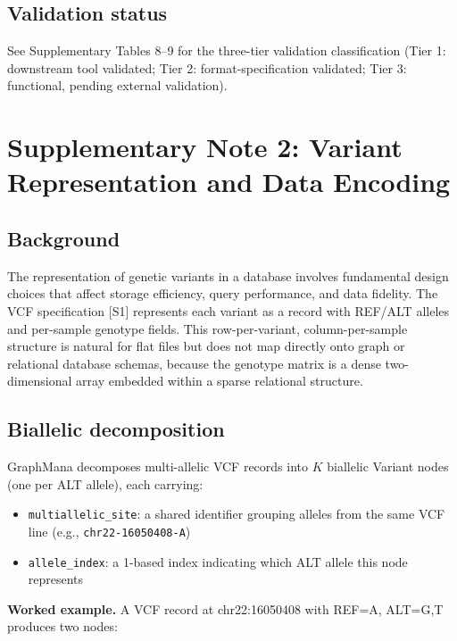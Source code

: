 \documentclass[11pt,a4paper]{article}
\begin{document}
\subsection*{Validation status}

See Supplementary Tables 8--9 for the three-tier validation classification (Tier 1: downstream tool validated; Tier 2: format-specification validated; Tier 3: functional, pending external validation).

\newpage

\section{Supplementary Note 2: Variant Representation and Data Encoding}

\subsection*{Background}

The representation of genetic variants in a database involves fundamental design choices that affect storage efficiency, query performance, and data fidelity. The VCF specification [S1] represents each variant as a record with REF/ALT alleles and per-sample genotype fields. This row-per-variant, column-per-sample structure is natural for flat files but does not map directly onto graph or relational database schemas, because the genotype matrix is a dense two-dimensional array embedded within a sparse relational structure.

\subsection*{Biallelic decomposition}

GraphMana decomposes multi-allelic VCF records into $K$ biallelic Variant nodes (one per ALT allele), each carrying:
\begin{itemize}
\item \texttt{multiallelic\_site}: a shared identifier grouping alleles from the same VCF line (e.g., \texttt{chr22-16050408-A})
\item \texttt{allele\_index}: a 1-based index indicating which ALT allele this node represents
\end{itemize}

\noindent\textbf{Worked example.} A VCF record at chr22:16050408 with REF=A, ALT=G,T produces two nodes:
\end{document}
